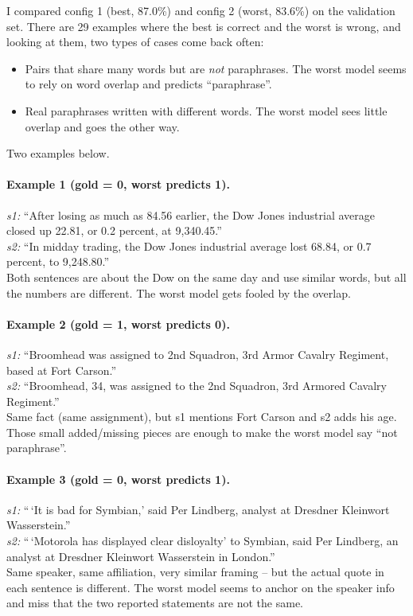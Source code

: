 \documentclass[11pt]{article}
\begin{document}
I compared config 1 (best, 87.0\%) and config 2 (worst, 83.6\%) on the validation set. There are 29 examples where the best is correct and the worst is wrong, and looking at them, two types of cases come back often:

\begin{itemize}[leftmargin=*]
    \item Pairs that share many words but are \emph{not} paraphrases. The worst model seems to rely on word overlap and predicts ``paraphrase''.
    \item Real paraphrases written with different words. The worst model sees little overlap and goes the other way.
\end{itemize}

Two examples below.

\paragraph{Example 1 (gold = 0, worst predicts 1).}
\emph{s1:} ``After losing as much as 84.56 earlier, the Dow Jones industrial average closed up 22.81, or 0.2 percent, at 9{,}340.45.''\\
\emph{s2:} ``In midday trading, the Dow Jones industrial average lost 68.84, or 0.7 percent, to 9{,}248.80.''\\
Both sentences are about the Dow on the same day and use similar words, but all the numbers are different. The worst model gets fooled by the overlap.

\paragraph{Example 2 (gold = 1, worst predicts 0).}
\emph{s1:} ``Broomhead was assigned to 2nd Squadron, 3rd Armor Cavalry Regiment, based at Fort Carson.''\\
\emph{s2:} ``Broomhead, 34, was assigned to the 2nd Squadron, 3rd Armored Cavalry Regiment.''\\
Same fact (same assignment), but s1 mentions Fort Carson and s2 adds his age. Those small added/missing pieces are enough to make the worst model say ``not paraphrase''.

\paragraph{Example 3 (gold = 0, worst predicts 1).}
\emph{s1:} ``\,`It is bad for Symbian,' said Per Lindberg, analyst at Dresdner Kleinwort Wasserstein.''\\
\emph{s2:} ``\,`Motorola has displayed clear disloyalty' to Symbian, said Per Lindberg, an analyst at Dresdner Kleinwort Wasserstein in London.''\\
Same speaker, same affiliation, very similar framing -- but the actual quote in each sentence is different. The worst model seems to anchor on the speaker info and miss that the two reported statements are not the same.
\end{document}
